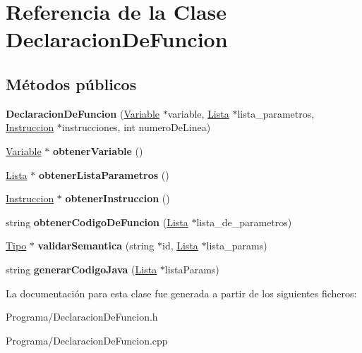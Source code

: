 \hypertarget{class_declaracion_de_funcion}{\section{Referencia de la Clase Declaracion\-De\-Funcion}
\label{class_declaracion_de_funcion}
}
\subsection*{Métodos públicos}
\begin{DoxyCompactItemize}
\item 
\hypertarget{class_declaracion_de_funcion_a72ad60a305a7c9534500fdca9ba85c67}{{\bfseries Declaracion\-De\-Funcion} (\hyperlink{class_variable}{Variable} $\ast$variable, \hyperlink{class_lista}{Lista} $\ast$lista\-\_\-parametros, \hyperlink{class_instruccion}{Instruccion} $\ast$instrucciones, int numero\-De\-Linea)}\label{class_declaracion_de_funcion_a72ad60a305a7c9534500fdca9ba85c67}

\item 
\hypertarget{class_declaracion_de_funcion_a0510104c3569f7332d74bef2593a4151}{\hyperlink{class_variable}{Variable} $\ast$ {\bfseries obtener\-Variable} ()}\label{class_declaracion_de_funcion_a0510104c3569f7332d74bef2593a4151}

\item 
\hypertarget{class_declaracion_de_funcion_aa096e75a0544a2242d649eff5a82ee8c}{\hyperlink{class_lista}{Lista} $\ast$ {\bfseries obtener\-Lista\-Parametros} ()}\label{class_declaracion_de_funcion_aa096e75a0544a2242d649eff5a82ee8c}

\item 
\hypertarget{class_declaracion_de_funcion_a5383673179a0c4ab30120ba6186bda45}{\hyperlink{class_instruccion}{Instruccion} $\ast$ {\bfseries obtener\-Instruccion} ()}\label{class_declaracion_de_funcion_a5383673179a0c4ab30120ba6186bda45}

\item 
\hypertarget{class_declaracion_de_funcion_a8fc6cf52d287de4176fd487b1a6c29d2}{string {\bfseries obtener\-Codigo\-De\-Funcion} (\hyperlink{class_lista}{Lista} $\ast$lista\-\_\-de\-\_\-parametros)}\label{class_declaracion_de_funcion_a8fc6cf52d287de4176fd487b1a6c29d2}

\item 
\hypertarget{class_declaracion_de_funcion_a6a8f0706ead7de11f5fafe2492df24ee}{\hyperlink{class_tipo}{Tipo} $\ast$ {\bfseries validar\-Semantica} (string $\ast$id, \hyperlink{class_lista}{Lista} $\ast$lista\-\_\-params)}\label{class_declaracion_de_funcion_a6a8f0706ead7de11f5fafe2492df24ee}

\item 
\hypertarget{class_declaracion_de_funcion_adeb0eef0e90c7b6f9c1d47ee943611d2}{string {\bfseries generar\-Codigo\-Java} (\hyperlink{class_lista}{Lista} $\ast$lista\-Params)}\label{class_declaracion_de_funcion_adeb0eef0e90c7b6f9c1d47ee943611d2}

\end{DoxyCompactItemize}


La documentación para esta clase fue generada a partir de los siguientes ficheros\-:\begin{DoxyCompactItemize}
\item 
Programa/Declaracion\-De\-Funcion.\-h\item 
Programa/Declaracion\-De\-Funcion.\-cpp\end{DoxyCompactItemize}

